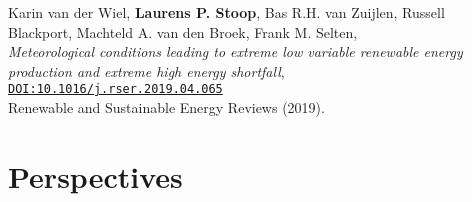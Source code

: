 \begin{etaremune}
{\item Karin van der Wiel\ts{\Letter}, \textbf{Laurens P. Stoop}, Bas R.H. van Zuijlen, Russell Blackport, Machteld A. van den Broek, Frank M. Selten, \\
\textit{Meteorological conditions leading to extreme low variable renewable energy production and extreme high energy shortfall}, \\
\texttt{\href{https://doi.org/10.1016/j.rser.2019.04.065}{DOI:10.1016/j.rser.2019.04.065}} \\
Renewable and Sustainable Energy Reviews (2019).

}\end{etaremune}

\section*{Perspectives}
